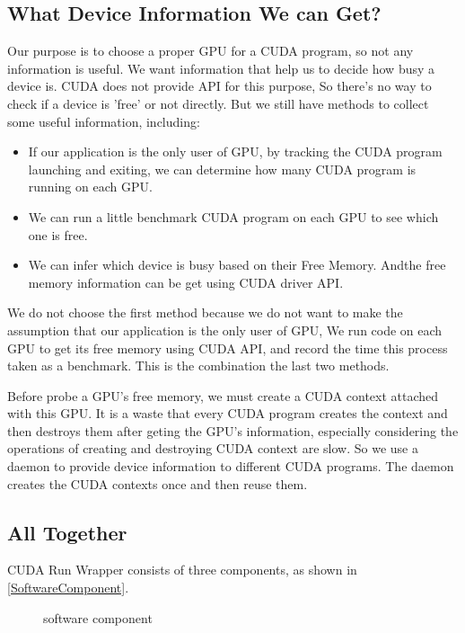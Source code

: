 \documentclass[a4paper,11pt]{article}
\begin{document}
\subsection{What Device Information We can Get?}
Our purpose is to choose a proper GPU for a CUDA program, so not any information is useful.
We want information that help us to decide how busy a device is.
CUDA does not provide API for this purpose, So there's no way to check if a device is 'free' or not directly.
But we still have methods to collect some useful information, including:
\begin{itemize}
  \item If our application is the only user of GPU, by tracking the CUDA program launching and exiting, we can determine how many CUDA program is running on each GPU.
  \item We can run a little benchmark CUDA program on each GPU to see which one is free.
  \item We can infer which device is busy based on their Free Memory. Andthe free memory information can be get using CUDA driver API.
\end{itemize}
We do not choose the first method because we do not want to make the assumption that our application is the only user of GPU,
We run code on each GPU to get its free memory using CUDA API, and record the time this process taken as a benchmark.
This is the combination the last two methods.

Before probe a GPU's free memory, we must create a CUDA context attached with
this GPU. It is a waste that every CUDA program creates the context and
then destroys them after geting the GPU's information, especially considering the
operations of creating and destroying CUDA context are slow. So we use a daemon to
provide device information to different CUDA programs. The daemon
creates the CUDA contexts once and then reuse them.

\subsection{All Together}
CUDA Run Wrapper consists of three components, as shown in \autoref{SoftwareComponent}.
\begin{figure}[h]
  \centering
{}
 \caption{software component}
 \label{SoftwareComponent}
\end{figure}
\end{document}
